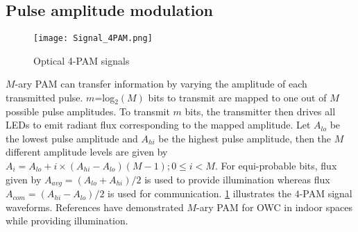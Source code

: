 \subsection{Pulse amplitude modulation}
\label{subsec:sisoModulationPAM}
\begin{figure}[!t]
	\centering
		\texttt{[image: Signal\_4PAM.png]}
		\caption[Optical PAM signals]{Optical 4-PAM signals}
		\label{fig:sisoSig4PAM}
\end{figure}
$M$-ary PAM can transfer information by varying the amplitude of each transmitted pulse. $m$=log$^{ }_{2}(M)$ bits to transmit are mapped to one out of $M$ possible pulse amplitudes. To transmit $m$ bits, the transmitter then drives all LEDs to emit radiant flux corresponding to the mapped amplitude. Let $A_{lo}$ be the lowest pulse amplitude and $A_{hi}$ be the highest pulse amplitude, then the $M$ different amplitude levels are given by $A_{i} = A_{lo} + i\times(A_{hi}-A_{lo})(M-1); 0\leq i<M$. For equi-probable bits, flux given by $A_{avg} = (A_{lo} + A_{hi})/2$ is used to provide illumination whereas flux $A_{com} = (A_{hi}-A_{lo})/2$ is used for communication. \figurename{ \ref{fig:sisoSig4PAM}} illustrates the $4$-PAM signal waveforms. References \cite{gru08b} have demonstrated $M$-ary PAM for OWC in indoor spaces while providing illumination.



